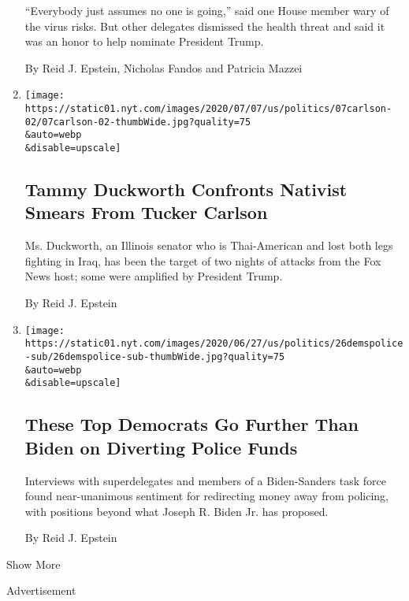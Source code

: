 \begin{enumerate}
  ``Everybody just assumes no one is going,'' said one House member wary
  of the virus risks. But other delegates dismissed the health threat
  and said it was an honor to help nominate President Trump.

  By Reid J. Epstein, Nicholas Fandos and Patricia Mazzei
\item
  \href{/2020/07/08/us/politics/tucker-carlson-tammy-duckworth.html}{}

  \texttt{[image: https://static01.nyt.com/images/2020/07/07/us/politics/07carlson-02/07carlson-02-thumbWide.jpg?quality=75\\\&auto=webp\\\&disable=upscale]}

  \hypertarget{tammy-duckworth-confronts-nativist-smears-from-tucker-carlson}{%
  \subsection{Tammy Duckworth Confronts Nativist Smears From Tucker
  Carlson}\label{tammy-duckworth-confronts-nativist-smears-from-tucker-carlson}}

  Ms. Duckworth, an Illinois senator who is Thai-American and lost both
  legs fighting in Iraq, has been the target of two nights of attacks
  from the Fox News host; some were amplified by President Trump.

  By Reid J. Epstein
\item
  \href{/2020/06/26/us/politics/defund-police-protests-democrats.html}{}

  \texttt{[image: https://static01.nyt.com/images/2020/06/27/us/politics/26demspolice-sub/26demspolice-sub-thumbWide.jpg?quality=75\\\&auto=webp\\\&disable=upscale]}

  \hypertarget{these-top-democrats-go-further-than-biden-on-diverting-police-funds}{%
  \subsection{These Top Democrats Go Further Than Biden on Diverting
  Police
  Funds}\label{these-top-democrats-go-further-than-biden-on-diverting-police-funds}}

  Interviews with superdelegates and members of a Biden-Sanders task
  force found near-unanimous sentiment for redirecting money away from
  policing, with positions beyond what Joseph R. Biden Jr. has proposed.

  By Reid J. Epstein
\end{enumerate}

Show More

Advertisement

